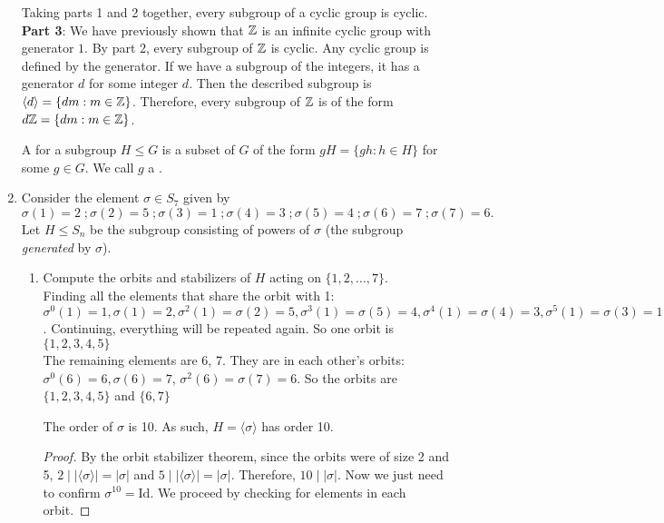\documentclass{amsart}
\begin{document}
\begin{enumerate}
Taking parts 1 and 2 together, every subgroup of a cyclic group is cyclic.\\

\textbf{Part 3}: We have previously shown that $\mathbb{Z}$ is an infinite cyclic group with generator $1$. By part 2, every subgroup of $\mathbb{Z}$ is cyclic. Any cyclic group is defined by the generator. If we have a subgroup of the integers, it has a generator $d$ for some integer $d$. Then the described subgroup is $\langle d\rangle=\{dm:m\in\mathbb{Z}\}$. Therefore, every subgroup of $\mathbb{Z}$ is of the form $d\mathbb{Z}=\{dm:m\in\mathbb{Z}\}$.\\


\vspace{0.2in}

A  for a subgroup $H\leq G$ is a subset of $G$ of the form $gH = \{gh:h\in H\}$ for some $g\in G$. We call $g$ a .

\item Consider the element $\sigma\in S_7$ given by 
\[
\sigma(1) = 2\;; \sigma(2) = 5\;; \sigma(3) = 1\;; \sigma (4) = 3\;; \sigma(5) = 4\;;\sigma(6)=7\;;\sigma(7)=6.
\]
Let $H\leq S_n$ be the subgroup consisting of powers of $\sigma$ (the subgroup \emph{generated} by $\sigma$). 
\begin{enumerate}
	\item Compute the orbits and stabilizers of $H$ acting on $\{1,2,\ldots,7\}$.\\

    Finding all the elements that share the orbit with 1:
    $\sigma^0(1)=1,\sigma(1)=2,\sigma^2(1)=\sigma(2)=5,\sigma^3(1)=\sigma(5)=4,\sigma^4(1)=\sigma(4)=3,\sigma^5(1)=\sigma(3)=1$. Continuing, everything will be repeated again. 
    So one orbit is $\{1,2,3,4,5\}$\\

    The remaining elements are 6, 7. They are in each other's orbits: $\sigma^0(6)=6,\sigma(6)=7$, $\sigma^2(6)=\sigma(7)=6$. 
    So the orbits are $\{1,2,3,4,5\}$ and $\{6,7\}$\\

    \begin{lemma}
        The order of $\sigma$ is 10. As such, $H=\langle\sigma\rangle$ has order 10.
    \end{lemma}

    \begin{proof}
        By the orbit stabilizer theorem, since the orbits were of size 2 and 5, $2\mid|\langle\sigma\rangle|=|\sigma|$ and $5\mid|\langle\sigma\rangle|=|\sigma|$. Therefore, $10\mid|\sigma|$. Now we just need to confirm $\sigma^{10}=\mathrm{Id}$. We proceed by checking for elements in each orbit.


\end{proof}
\end{enumerate}
\end{enumerate}
\end{document}
